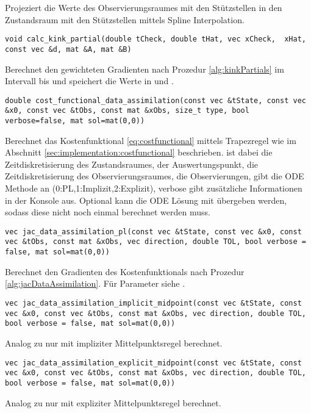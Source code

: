 Projeziert die Werte  des Observierungsraumes mit den Stützstellen  in den Zustandsraum mit den Stützstellen  mittels Spline Interpolation.
%
\begin{lstlisting}[numbers=none]
void calc_kink_partial(double tCheck, double tHat, vec xCheck,  xHat, const vec &d, mat &A, mat &B)
\end{lstlisting}
Berechnet den gewichteten Gradienten nach Prozedur \ref{alg:kinkPartials} im Intervall  bis  und speichert die Werte in  und .
\begin{lstlisting}[numbers=none]
double cost_functional_data_assimilation(const vec &tState, const vec &x0, const vec &tObs, const mat &xObs, size_t type, bool verbose=false, mat sol=mat(0,0))
\end{lstlisting}
Berechnet das Kostenfunktional \eqref{eq:costfunctional} mittels Trapezregel wie im Abschnitt \ref{sec:implementation:costfunctional} beschrieben.  ist dabei die Zeitdiskretisierung des Zustandsraumes,  der Auswertungspunkt,  die Zeitdiskretisierung des Observierungsraumes,  die Observierungen,  gibt die ODE Methode an (0:PL,1:Implizit,2:Explizit), verbose gibt zusätzliche Informationen in der Konsole aus. Optional kann die ODE Lösung  mit übergeben werden, sodass diese nicht noch einmal berechnet werden muss.  
\begin{lstlisting}[numbers=none]
vec jac_data_assimilation_pl(const vec &tState, const vec &x0, const vec &tObs, const mat &xObs, vec direction, double TOL, bool verbose = false, mat sol=mat(0,0))
\end{lstlisting}
Berechnet den Gradienten des Kostenfunktionals nach Prozedur \ref{alg:jacDataAssimilation}. Für Parameter siehe .
\begin{lstlisting}[numbers=none]
vec jac_data_assimilation_implicit_midpoint(const vec &tState, const vec &x0, const vec &tObs, const mat &xObs, vec direction, double TOL, bool verbose = false, mat sol=mat(0,0))
\end{lstlisting}
Analog zu  nur mit impliziter Mittelpunktsregel berechnet.
\begin{lstlisting}[numbers=none]
vec jac_data_assimilation_explicit_midpoint(const vec &tState, const vec &x0, const vec &tObs, const mat &xObs, vec direction, double TOL, bool verbose = false, mat sol=mat(0,0))
\end{lstlisting}
Analog zu  nur mit expliziter Mittelpunktsregel berechnet.
